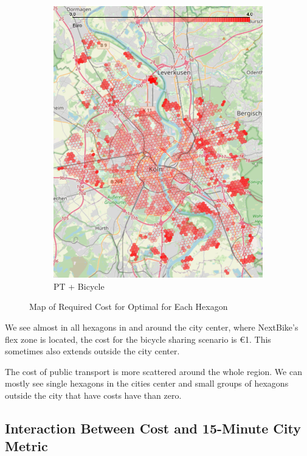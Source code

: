 \begin{figure}
\begin{subfigure}[b]{0.3\textwidth}
         \includegraphics[width=\textwidth]{Figures/results/cost/bicycle_public_transport_cost_map}
         \caption{PT + Bicycle}
         \label{fig:bicycle_public_transport_cost_map}
     \end{subfigure}
       \caption{Map of Required Cost for Optimal for Each Hexagon}
        \label{fig:cost_map_per_scenario}
\end{figure}
We see almost in all hexagons in and around the city center, where NextBike's flex zone is located, the cost for the bicycle sharing scenario is \euro{1}.
This sometimes also extends outside the city center.

The cost of public transport is more scattered around the whole region. 
We can mostly see single hexagons in the cities center and small groups of hexagons outside the city that have costs have than zero.

\subsection{Interaction Between Cost and 15-Minute City Metric}
\label{subsec:interaction_between_cost_and_15_minute_city_metric}

